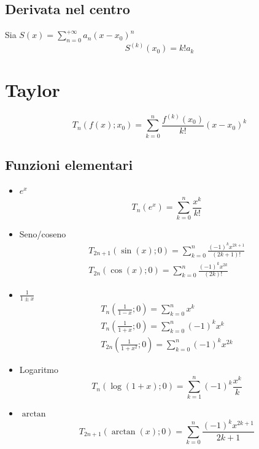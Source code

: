 \documentclass[11pt]{article}
\theoremstyle{definition}
\theoremstyle{remark}
\begin{document}
\subsection*{Derivata nel centro}
Sia $S(x)=\sum_{n=0}^{+\infty}a_n(x-x_0)^n$
\begin{equation*}
    S^{(k)}(x_0) = k!a_k
\end{equation*}

\section*{Taylor}
\begin{equation*}
    T_n(f(x);x_0)=\sum_{k=0}^{n}\frac{f^{(k)}(x_0)}{k!}(x-x_0)^k
\end{equation*}
\subsection*{Funzioni elementari}
\begin{itemize}
    \item $e^x$
        \begin{equation*}
            T_n(e^x)=\sum_{k=0}^{n} \frac{x^k}{k!}
        \end{equation*}
    \item Seno/coseno
        \begin{gather*}
            T_{2n+1}(\sin(x);0) = \sum_{k=0}^{n} \frac{(-1)^kx^{2k+1}}{(2k+1)!}\\
            T_{2n}(\cos(x);0) = \sum_{k=0}^{n} \frac{(-1)^kx^{2k}}{(2k)!}
        \end{gather*}
    \item $\frac{1}{1\pm x}$
        \begin{gather*}
            T_n(\tfrac{1}{1-x};0)=\sum_{k=0}^{n}x^k \\
            T_n(\tfrac{1}{1+x};0)=\sum_{k=0}^{n}(-1)^kx^k \\
            T_{2n}(\tfrac{1}{1+x^2};0)=\sum_{k=0}^{n}(-1)^kx^{2k}
        \end{gather*}
    \item Logaritmo
        \begin{equation*}
            T_n(\log(1+x);0)= \sum_{k=1}^{n}(-1)^k \frac{x^k}{k}
        \end{equation*}
    \item $\arctan$
        \begin{equation*}
            T_{2n+1}(\arctan(x);0)= \sum_{k=0}^{n} \frac{(-1)^kx^{2k+1}}{2k+1}
        \end{equation*}
\end{itemize}
\end{document}
